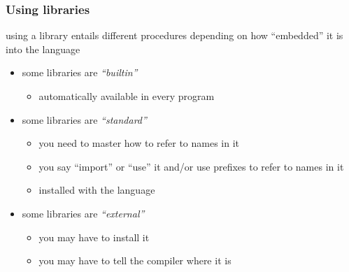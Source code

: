 \documentclass[12pt,dvipdfmx]{beamer}
\newcommand{\ao}[1]{{\color{blue}#1}}
\begin{document}
\begin{frame}
  \frametitle{Using libraries}
  using a library entails different procedures depending on how
  ``embedded'' it is into the language
  \begin{itemize}
  \item some libraries are \ao{\it ``builtin''}
    \begin{itemize}
    \item automatically available in every program
    \end{itemize}
  \item some libraries are \ao{\it ``standard''}
    \begin{itemize}
    \item you need to master how to refer to names in it
    \item you say ``import'' or ``use'' it
      and/or use prefixes to refer to names in it
    \item installed with the language
    \end{itemize}
    
  \item some libraries are \ao{\it ``external''}
    \begin{itemize}
    \item you may have to install it
    \item you may have to tell the compiler where it is
    \end{itemize}
  \end{itemize}
\end{frame}
\end{document}
